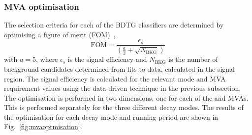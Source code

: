 \subsubsection{MVA optimisation}

The selection criteria for each of the BDTG classifiers are determined by optimising a figure of merit (FOM)~\cite{Punzi:2003bu}, 
\begin{equation}
\text{FOM}= \frac{\epsilon_{s}}{(\frac{a}{2} + \sqrt{N_{\text{BKG}}})}
\end{equation}
with $a=5$, where $\epsilon_{s}$ is the signal efficiency and $N_{\text{BKG}}$ is the number of background candidates determined from fits to data, calculated in the signal region. 
The signal efficiency is calculated for the relevant mode and MVA requirement values using the data-driven technique in the previous subsection. 
The optimisation is performed in two dimensions, one for each of the \phiz and \Dsp MVAs. This is performed separately for the three different \Dsp decay modes. The results of the optimisation for each \Dsp decay mode and running period are shown in Fig.~\ref{fig:mvaoptmisation}. 

